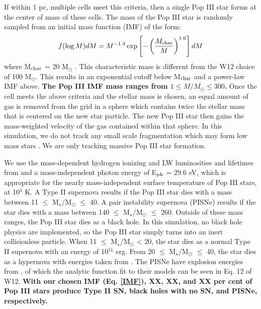 \documentclass[fleqn,usenatbib]{mnras}
\begin{document}
If within 1 pc, multiple cells meet this criteria, then a single Pop III star forms at the center of mass of these cells. The mass of the Pop III star is randomly sampled from an initial mass function (IMF) of the form:
\begin{equation} \label{IMF}
	f(\log M)dM = M^{-1.3} \exp \left[-\left( \frac{M_{\rm char}}{M}\right)^{1.6} \right]dM
\end{equation}
where M$_{\rm char}$ = 20 M$_{\odot}$ \citep{Hirano17}. This characteristic mass is different from the W12 choice of 100 M$_{\odot}$. This results in an exponential cutoff below M$_{\rm char}$ and a power-law IMF above. \textbf{The Pop III IMF mass ranges from $1 \leq M / M_{\odot} \leq 300$. }Once the cell meets the above criteria and the stellar mass is chosen, an equal amount of gas is removed from the grid in a sphere which contains twice the stellar mass that is centered on the new star particle. The new Pop III star then gains the mass-weighted velocity of the gas contained within that sphere. In this simulation, we do not track any small scale fragmentation which may form low mass stars \citep{Greif11_P3Cluster}. We are only tracking massive Pop III star formation.

We use the mass-dependent hydrogen ionizing and LW luminosities and lifetimes from \citet{Schaerer02} and a mass-independent photon energy of E$_{\rm ph}$ = 29.6 eV, which is appropriate for the nearly mass-independent surface temperature of Pop III stars, at 10$^{5}$ K. A Type II supernova results if the Pop III star dies with a mass between 11 $\leq$ M$_{\star}$/M$_{\odot}$ $\leq$ 40. A pair instability supernova (PISNe) results if the star dies with a mass between 140 $\leq$ M$_{\star}$/M$_{\odot}$ $\leq$ 260. Outside of these mass ranges, the Pop III star dies as a black hole. In this simulation, no black hole physics are implemented, so the Pop III star simply turns into an inert collisionless particle. When 11 $\leq$ M$_{\star}$/M$_{\odot}$ < 20, the star dies as a normal Type II supernova with an energy of 10$^{51}$ erg. From 20 $\leq$ M$_{\star}$/M$_{\odot}$ $\leq$ 40, the star dies as a hypernova with energies taken from \citet{Nomoto06}. The PISNe have explosion energies from \citet{2002ApJ...567..532H}, of which the analytic function fit to their models can be seen in Eq. 12 of W12. \textbf{With our chosen IMF (Eq. \ref{IMF}), XX, XX, and XX per cent of Pop III stars produce Type II SN, black holes with no SN, and PISNe, respectively.} 

\end{document}
